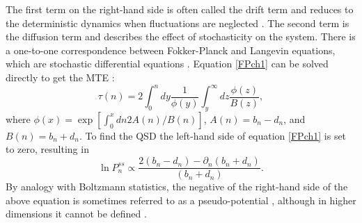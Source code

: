 The first term on the right-hand side is often called the drift term and reduces to the deterministic dynamics when fluctuations are neglected \cite{Gardiner2004}. 
The second term is the diffusion term and describes the effect of stochasticity on the system. 
There is a one-to-one correspondence between Fokker-Planck and Langevin equations, which are stochastic differential equations \cite{Gardiner2004}. 
Equation \ref{FPch1} can be solved directly to get the MTE \cite{Gardiner2004,Iyer-Biswas2015}: 
\begin{equation}
\tau(n) = 2\int_0^n dy \frac{1}{\phi(y)} \int_y^\infty dz \frac{\phi(z)}{B(z)},
\end{equation}
where $\phi(x) = \exp\left[\int_0^x dn 2 A(n)/B(n)\right]$, $A(n) = b_n - d_n$, and $B(n) = b_n + d_n$. 
To find the QSD the left-hand side of equation \ref{FPch1} is set to zero, resulting in \cite{Gardiner2004}
\begin{equation}
\ln P_n^{ss} \propto \frac{2(b_n - d_n) - \partial_n(b_n + d_n)}{(b_n + d_n)}. 
\end{equation}
By analogy with Boltzmann statistics, the negative of the right-hand side of the above equation is sometimes referred to as a pseudo-potential \cite{Roozen1987,Grasman1996,Zhou2012,Yan2013}, although in higher dimensions it cannot be defined \cite{Zhou2012,Badali2019a}. %

